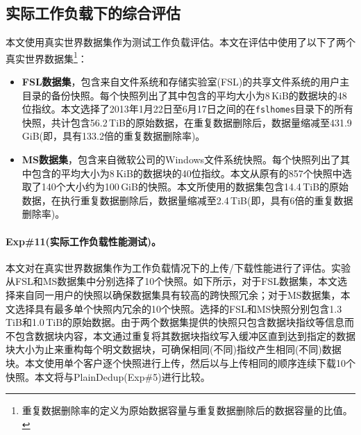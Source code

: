 \subsection{实际工作负载下的综合评估}
\label{subsec:sgxdedup-real-world}

本文使用真实世界数据集作为测试工作负载评估\sysnameS。本文在评估中使用了以下了两个真实世界数据集\footnote{重复数据删除率的定义为原始数据容量与重复数据删除后的数据容量的比值。}：

\begin{itemize}[leftmargin=0em]
    \item \textbf{FSL数据集}，包含来自文件系统和存储实验室(FSL)\cite{fsl,sun16}的共享文件系统的用户主目录的备份快照。每个快照列出了其中包含的平均大小为8\,KiB的数据块的48位指纹。本文选择了2013年1月22日至6月17日之间的在\texttt{fslhomes}目录下的所有快照，共计包含56.2\,TiB的原始数据，在重复数据删除后，数据量缩减至431.9\,GiB(即，具有133.2倍的重复数据删除率)。
    \item \textbf{MS数据集}，包含来自微软公司\cite{meyer2011deduplication}的Windows文件系统快照。每个快照列出了其中包含的平均大小为8\,KiB的数据块的40位指纹。本文从原有的857个快照中选取了140个大小约为100\,GiB的快照。本文所使用的数据集包含14.4\,TiB的原始数据，在执行重复数据删除后，数据量缩减至2.4\,TiB(即，具有6倍的重复数据删除率)。
\end{itemize}

\paragraph*{Exp\#11(实际工作负载性能测试)。} 本文对\sysnameS 在真实世界数据集作为工作负载情况下的上传/下载性能进行了评估。实验从FSL和MS数据集中分别选择了10个快照。如下所示，对于FSL数据集，本文选择来自同一用户的快照以确保数据集具有较高的跨快照冗余；对于MS数据集，本文选择具有最多单个快照内冗余的10个快照。选择的FSL和MS快照分别包含1.3\,TiB和1.0\,TiB的原始数据。由于两个数据集提供的快照只包含数据块指纹等信息而不包含数据块内容，本文通过重复将其数据块指纹写入缓冲区直到达到指定的数据块大小为止来重构每个明文数据块，可确保相同(不同)指纹产生相同(不同)数据块。本文使用单个客户逐个快照进行上传，然后以与上传相同的顺序连续下载10个快照。本文将\sysnameS 与PlainDedup(Exp\#5)进行比较。

